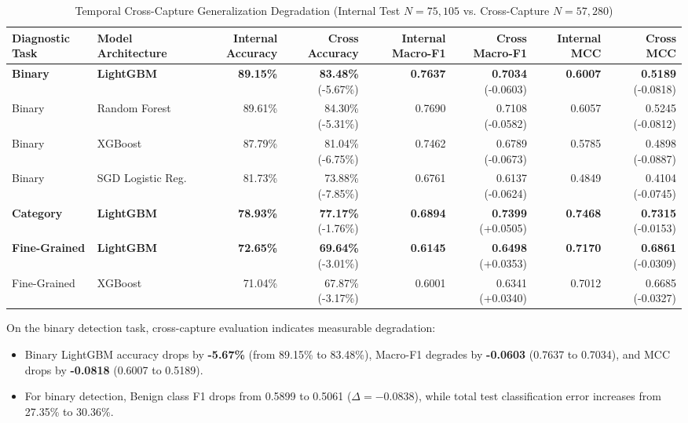 \documentclass[conference,10pt,twocolumn]{IEEEtran}
\begin{document}
\begin{table}[t]
\centering
\caption{Temporal Cross-Capture Generalization Degradation (Internal Test $N=75,105$ vs. Cross-Capture $N=57,280$)}
\label{tab:cross_capture_results}
\small
\begin{tabular}{@{}llrrrrrr@{}}
\toprule
\textbf{Diagnostic Task} & \textbf{Model Architecture} & \textbf{Internal Accuracy} & \textbf{Cross Accuracy} & \textbf{Internal Macro-F1} & \textbf{Cross Macro-F1} & \textbf{Internal MCC} & \textbf{Cross MCC} \\ \midrule
\textbf{Binary} & \textbf{LightGBM} & \textbf{89.15\%} & \textbf{83.48\%} (-5.67\%) & \textbf{0.7637} & \textbf{0.7034} (-0.0603) & \textbf{0.6007} & \textbf{0.5189} (-0.0818) \\
Binary & Random Forest & 89.61\% & 84.30\% (-5.31\%) & 0.7690 & 0.7108 (-0.0582) & 0.6057 & 0.5245 (-0.0812) \\
Binary & XGBoost & 87.79\% & 81.04\% (-6.75\%) & 0.7462 & 0.6789 (-0.0673) & 0.5785 & 0.4898 (-0.0887) \\
Binary & SGD Logistic Reg. & 81.73\% & 73.88\% (-7.85\%) & 0.6761 & 0.6137 (-0.0624) & 0.4849 & 0.4104 (-0.0745) \\ \midrule
\textbf{Category} & \textbf{LightGBM} & \textbf{78.93\%} & \textbf{77.17\%} (-1.76\%) & \textbf{0.6894} & \textbf{0.7399} (+0.0505) & \textbf{0.7468} & \textbf{0.7315} (-0.0153) \\ \midrule
\textbf{Fine-Grained} & \textbf{LightGBM} & \textbf{72.65\%} & \textbf{69.64\%} (-3.01\%) & \textbf{0.6145} & \textbf{0.6498} (+0.0353) & \textbf{0.7170} & \textbf{0.6861} (-0.0309) \\
Fine-Grained & XGBoost & 71.04\% & 67.87\% (-3.17\%) & 0.6001 & 0.6341 (+0.0340) & 0.7012 & 0.6685 (-0.0327) \\ \bottomrule
\end{tabular}
\end{table}

On the binary detection task, cross-capture evaluation indicates measurable degradation:
\begin{itemize}
    \item Binary LightGBM accuracy drops by \textbf{-5.67\%} (from 89.15\% to 83.48\%), Macro-F1 degrades by \textbf{-0.0603} (0.7637 to 0.7034), and MCC drops by \textbf{-0.0818} (0.6007 to 0.5189).
    \item For binary detection, Benign class F1 drops from 0.5899 to 0.5061 ($\Delta = -0.0838$), while total test classification error increases from 27.35\% to 30.36\%.
\end{itemize}
\end{document}
